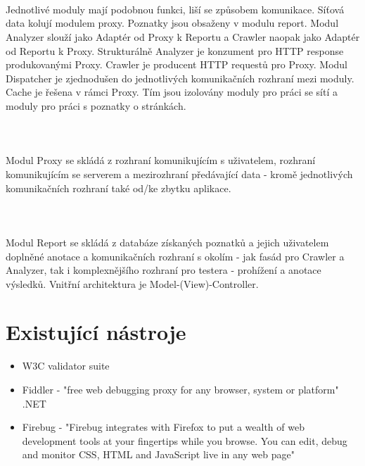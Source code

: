 \documentclass[10pt]{article}
\begin{document}
\paragraph{~}Jednotliv\'e moduly maj\'i podobnou funkci, li\v{s}\'i se zp\r{u}sobem komunikace. S\'i\v{t}ov\'a data koluj\'i modulem proxy. Poznatky jsou obsa\v{z}eny v modulu report. Modul Analyzer slou\v{z}\'i jako Adapt\'er od Proxy k Reportu a Crawler naopak jako Adapt\'er od Reportu k Proxy. Struktur\'aln\v{e} Analyzer je konzument pro HTTP response produkovan\'ymi Proxy. Crawler je producent HTTP request\r{u} pro Proxy. Modul Dispatcher je zjednodu\v{s}en do jednotliv\'ych komunika\v{c}n\'ich rozhran\'i mezi moduly. Cache je \v{r}e\v{s}ena v r\'amci Proxy. T\'im jsou izolov\'any moduly pro pr\'aci se s\'it\'i a moduly pro pr\'aci s poznatky o str\'ank\'ach.
\paragraph{~}Modul Proxy se skl\'ad\'a z rozhran\'i komunikuj\'ic\'im s u\v{z}ivatelem, rozhran\'i komunikuj\'ic\'im se serverem a mezirozhran\'i p\v{r}ed\'avaj\'ic\'i data - krom\v{e} jednotliv\'ych komunika\v{c}n\'ich rozhran\'i tak\'e od/ke zbytku aplikace.
\paragraph{~}Modul Report se skl\'ad\'a z datab\'aze z\'iskan\'ych poznatk\r{u} a jejich u\v{z}ivatelem dopln\v{e}n\'e anotace a komunika\v{c}n\'ich rozhran\'i s okol\'im - jak fas\'ad pro Crawler a Analyzer, tak i komplexn\v{e}j\v{s}\'iho rozhran\'i pro testera - proh\'i\v{z}en\'i a anotace v\'ysledk\r{u}. Vnit\v{r}n\'i architektura je Model-(View)-Controller.
\section{Existuj\'ic\'i n\'astroje}
\begin{itemize}
	\item W3C validator suite
	\item Fiddler - "free web debugging proxy for any browser, system or platform" .NET
	\item Firebug - "Firebug integrates with Firefox to put a wealth of web development tools at your fingertips while you browse. You can edit, debug and monitor CSS, HTML and JavaScript live in any web page"
\end{itemize}	
\end{document}
